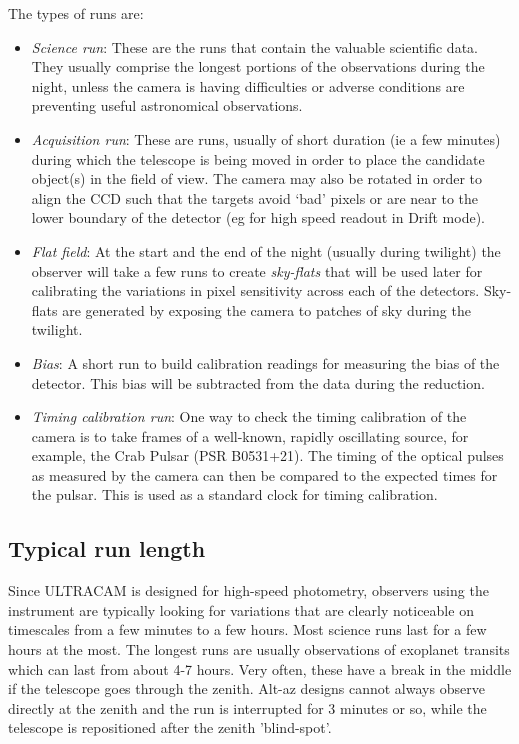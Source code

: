 The types of runs are: 
\begin{itemize}
	\item \emph{Science run}: These are the runs that contain the valuable scientific data. They usually comprise the longest portions of the observations during the night, unless the camera is having difficulties or adverse conditions are preventing useful astronomical observations.
	\item \emph{Acquisition run}: These are runs, usually of short duration (ie a few minutes) during which the telescope is being moved in order to place the candidate object(s) in the field of view. The camera may also be rotated in order to align the CCD such that the targets avoid `bad' pixels or are near to the lower boundary of the detector (eg for high speed readout in Drift mode). 
	\item \emph{Flat field}: At the start and the end of the night (usually during twilight) the observer will take a few runs to create \emph{sky-flats} that will be used later for calibrating the variations in pixel sensitivity across each of the detectors.  Sky-flats are generated by exposing the camera to patches of sky during the twilight. 
	\item \emph{Bias}: A short run to build calibration readings for measuring the bias of the detector. This bias will be subtracted from the data during the reduction. 
	\item \emph{Timing calibration run}: One way to check the timing calibration of the camera is to take frames of a well-known, rapidly oscillating source, for example, the Crab Pulsar (PSR B0531+21). The timing of the optical pulses as measured by the camera can then be compared to the expected times for the pulsar. This is used as a standard clock for timing calibration.
\end{itemize}

\subsection{Typical run length}
Since ULTRACAM is designed for high-speed photometry, observers using the instrument are typically looking for variations that are clearly noticeable on timescales from a few minutes to a few hours. Most science runs last for a few hours at the most. The longest runs are usually observations of exoplanet transits which can last from about 4-7 hours. Very often, these have a break in the middle if the telescope goes through the zenith. Alt-az designs cannot always observe directly at the zenith and the run is interrupted for 3 minutes or so, while the telescope is repositioned after the zenith 'blind-spot'.

